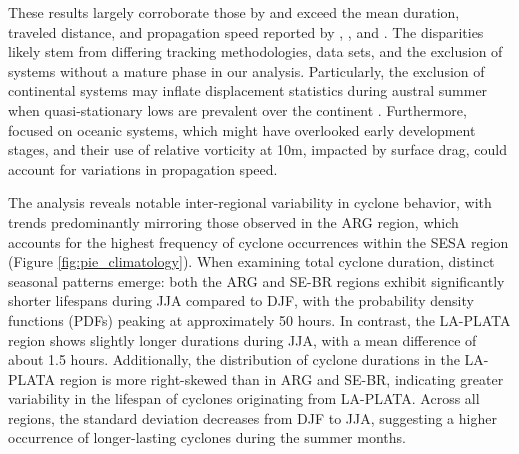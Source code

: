 These results largely corroborate those by \citet{gramcianinov2019properties, gramcianinov2020analysis, hoskins2005new} and exceed the mean duration, traveled distance, and propagation speed reported by \citet{simmonds2000mean}, \citet{mendes2010climatology}, and \citet{reboita2010south}. The disparities likely stem from differing tracking methodologies, data sets, and the exclusion of systems without a mature phase in our analysis. Particularly, the exclusion of continental systems may inflate displacement statistics during austral summer when quasi-stationary lows are prevalent over the continent \citep{mendes2010climatology}. Furthermore, \citet{reboita2010south} focused on oceanic systems, which might have overlooked early development stages, and their use of relative vorticity at 10m, impacted by surface drag, could account for variations in propagation speed.

The analysis reveals notable inter-regional variability in cyclone behavior, with trends predominantly mirroring those observed in the ARG region, which accounts for the highest frequency of cyclone occurrences within the SESA region (Figure \ref{fig:pie_climatology}). When examining total cyclone duration, distinct seasonal patterns emerge: both the ARG and SE-BR regions exhibit significantly shorter lifespans during JJA compared to DJF, with the probability density functions (PDFs) peaking at approximately 50 hours. In contrast, the LA-PLATA region shows slightly longer durations during JJA, with a mean difference of about 1.5 hours. Additionally, the distribution of cyclone durations in the LA-PLATA region is more right-skewed than in ARG and SE-BR, indicating greater variability in the lifespan of cyclones originating from LA-PLATA. Across all regions, the standard deviation decreases from DJF to JJA, suggesting a higher occurrence of longer-lasting cyclones during the summer months.

